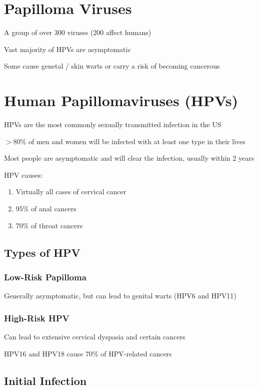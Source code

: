 \documentclass{notes}
\begin{document}
\section{Papilloma Viruses}

A group of over 300 viruses (200 affect humans)

Vast majority of HPVs are asymptomatic

\tab Some cause genetal / skin warts or carry a risk of becoming cancerous

\section{Human Papillomaviruses (HPVs)}

HPVs are the most commonly sexually transmitted infection in the US

\(>\)80\% of men and women will be infected with at least one type in their lives

\tab Most people are asymptomatic and will clear the infection, usually within 2 years

HPV causes:

\begin{enumerate}
    \item Virtually all cases of cervical cancer
    \item 95\% of anal cancers
    \item 70\% of throat cancers
\end{enumerate}

\subsection{Types of HPV}

\subsubsection{Low-Risk Papilloma}

Generally asymptomatic, but can lead to genital warts (HPV6 and HPV11)

\subsubsection{High-Risk HPV}

Can lead to extensive cervical dyspasia and certain cancers

\tab HPV16 and HPV18 cause 70\% of HPV-related cancers

\subsection{Initial Infection}
\end{document}
